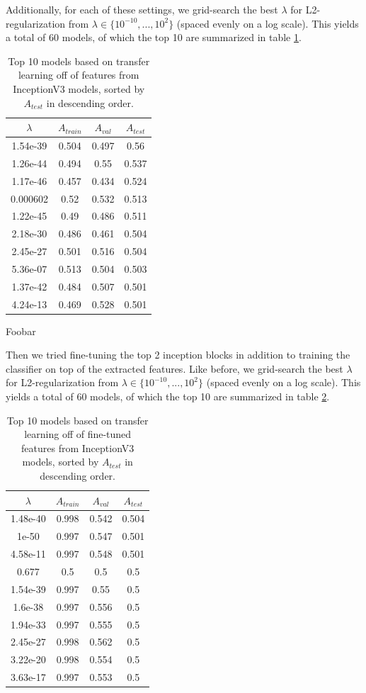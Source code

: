 Additionally, for each of these settings, we grid-search the best $\lambda$ for L2-regularization from $\lambda \in \{10^{-10}, ..., 10^{2}\}$ (spaced evenly on a log scale). This yields a total of $60$ models, of which the top 10 are summarized in table \ref{table:inceptionv3_1}.

\begin{table}[ht]
\centering
\begin{tabular}{ |c|c|c|c| }
\hline
$\lambda$ & $A_{train}$ & $A_{val}$ & $A_{test}$ \\
\hline
1.54e-39 & 0.504 & 0.497 & 0.56 \\
1.26e-44 & 0.494 & 0.55 & 0.537 \\
1.17e-46 & 0.457 & 0.434 & 0.524 \\
0.000602 & 0.52 & 0.532 & 0.513 \\
1.22e-45 & 0.49 & 0.486 & 0.511 \\
2.18e-30 & 0.486 & 0.461 & 0.504 \\
2.45e-27 & 0.501 & 0.516 & 0.504 \\
5.36e-07 & 0.513 & 0.504 & 0.503 \\
1.37e-42 & 0.484 & 0.507 & 0.501 \\
4.24e-13 & 0.469 & 0.528 & 0.501 \\
\hline
\end{tabular}
\caption{Foobar}
\caption{Top 10 models based on transfer learning off of features from InceptionV3 models, sorted by $A_{test}$ in descending order.}
\label{table:inceptionv3_1}
\end{table}

Then we tried fine-tuning the top 2 inception blocks in addition to training the classifier on top of the extracted features. Like before, we grid-search the best $\lambda$ for L2-regularization from $\lambda \in \{10^{-10}, ..., 10^{2}\}$ (spaced evenly on a log scale). This yields a total of $60$ models, of which the top 10 are summarized in table \ref{table:inceptionv3_2}.

\begin{table}[ht]
\centering
\begin{tabular}{ |c|c|c|c| }
\hline
$\lambda$ & $A_{train}$ & $A_{val}$ & $A_{test}$ \\
\hline
1.48e-40 & 0.998 & 0.542 & 0.504 \\
1e-50 & 0.997 & 0.547 & 0.501 \\
4.58e-11 & 0.997 & 0.548 & 0.501 \\
0.677 & 0.5 & 0.5 & 0.5 \\
1.54e-39 & 0.997 & 0.55 & 0.5 \\
1.6e-38 & 0.997 & 0.556 & 0.5 \\
1.94e-33 & 0.997 & 0.555 & 0.5 \\
2.45e-27 & 0.998 & 0.562 & 0.5 \\
3.22e-20 & 0.998 & 0.554 & 0.5 \\
3.63e-17 & 0.997 & 0.553 & 0.5 \\
\hline
\end{tabular}
\caption{Top 10 models based on transfer learning off of fine-tuned features from InceptionV3 models, sorted by $A_{test}$ in descending order.}
\label{table:inceptionv3_2}
\end{table}

